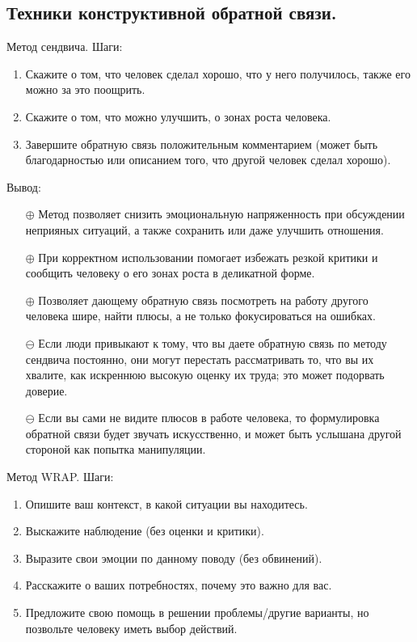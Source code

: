 \documentclass[12pt,a4paper]{report}
\begin{document}
\subsection*{Техники конструктивной обратной связи.}

{\large Метод сендвича. Шаги:}
\begin{enumerate}
	\item Скажите о том, что человек сделал хорошо, что у него получилось, также его можно за это поощрить.
	
	\item Скажите о том, что можно улучшить, о зонах роста человека.
	
	\item Завершите обратную связь положительным комментарием (может быть благодарностью или описанием того, что другой человек сделал хорошо).
\end{enumerate}

Вывод:
\begin{itemize}
	\item [$\oplus$] Метод позволяет снизить эмоциональную напряженность при обсуждении неприяных ситуаций, а также сохранить или даже улучшить отношения.
	
	\item [$\oplus$] При корректном использовании помогает избежать резкой критики и сообщить человеку о его зонах роста в деликатной форме.
	
	\item [$\oplus$] Позволяет дающему обратную связь посмотреть на работу другого человека шире, найти плюсы, а не только фокусироваться на ошибках.
	
	\item [$\ominus$] Если люди привыкают к тому, что вы даете обратную связь по методу сендвича постоянно, они могут перестать рассматривать то, что вы их хвалите, как искреннюю высокую оценку их труда; это может подорвать доверие.
	
	\item [$\ominus$] Если вы сами не видите плюсов в работе человека, то формулировка обратной связи будет звучать искусственно, и может быть услышана другой стороной как попытка манипуляции.
\end{itemize}

\bigskip\smallskip 
{\large Метод WRAP. Шаги:}
\begin{enumerate}
	\item Опишите ваш контекст, в какой ситуации вы находитесь.
	
	\item Выскажите наблюдение (без оценки и критики).
	
	\item Выразите свои эмоции по данному поводу (без обвинений).
	
	\item Расскажите о ваших потребностях, почему это важно для вас.
	
	\item Предложите свою помощь в решении проблемы/другие варианты, но позвольте человеку иметь выбор действий.
\end{enumerate}
\end{document}
